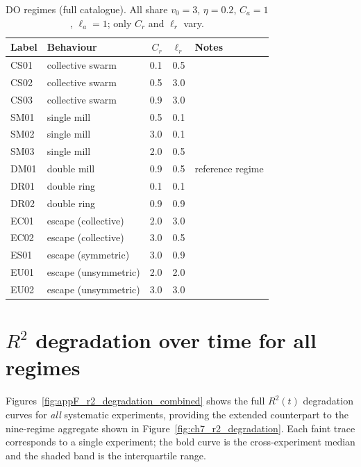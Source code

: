 \begin{table}[ht]
\centering
\caption{DO regimes (full catalogue).  All share $v_0{=}3$, $\eta{=}0.2$,
  $C_a{=}1$, $\ell_a{=}1$; only $C_r$ and $\ell_r$ vary.}
\label{tab:do_regimes_full}
\renewcommand{\arraystretch}{0.85}
\begin{tabular}{llrrl}
\hline
Label & Behaviour & $C_r$ & $\ell_r$ & Notes \\
\hline
CS01 & collective swarm    & 0.1 & 0.5 & \\
CS02 & collective swarm    & 0.5 & 3.0 & \\
CS03 & collective swarm    & 0.9 & 3.0 & \\
SM01 & single mill         & 0.5 & 0.1 & \\
SM02 & single mill         & 3.0 & 0.1 & \\
SM03 & single mill         & 2.0 & 0.5 & \\
DM01 & double mill         & 0.9 & 0.5 & reference regime \\
DR01 & double ring         & 0.1 & 0.1 & \\
DR02 & double ring         & 0.9 & 0.9 & \\
EC01 & escape (collective) & 2.0 & 3.0 & \\
EC02 & escape (collective) & 3.0 & 0.5 & \\
ES01 & escape (symmetric)  & 3.0 & 0.9 & \\
EU01 & escape (unsymmetric)& 2.0 & 2.0 & \\
EU02 & escape (unsymmetric)& 3.0 & 3.0 & \\
\hline
\end{tabular}
\end{table}

\section{$R^2$ degradation over time for all regimes}
\label{sec:regime_r2_degradation_all}

Figures~\ref{fig:appF_r2_degradation_combined}
shows the full $R^2(t)$
degradation curves for \emph{all} systematic experiments, providing the
extended counterpart to the nine-regime aggregate shown in
Figure~\ref{fig:ch7_r2_degradation}.  Each faint trace corresponds to a
single experiment; the bold curve is the cross-experiment median and the
shaded band is the interquartile range.


